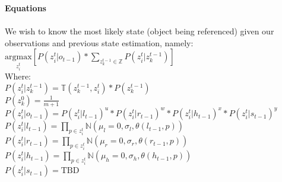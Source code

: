 \documentclass[12pt,letterpaper]{article}
\begin{document}
\textbf{Equations}\\\\
We wish to know the most likely state (object being referenced) given our observations and previous state estimation, namely:\\
$\underset{z^t_i}{\text{argmax}}[P(z^t_i | o_{t-1})*\displaystyle\sum_{z^{t-1}_k \in \mathbb{Z}} P(z^t_i|z^{t-1}_k)] $\\
Where:\\
$P(z^t_i | z^{t-1}_k) = \mathbb{T}(z^{t-1}_k, z^t_i)*P(z^{t-1}_k)$\\
$P(z^0_k) = \frac{1}{m+1}$\\
$P(z^t_i|o_{t-1}) = P(z^t_i|l_{t-1})^u*P(z^t_i|r_{t-1})^w*P(z^t_i|h_{t-1})^x*P(z^t_i|s_{t-1})^y$\\
$P(z^t_i|l_{t-1}) = \displaystyle \prod_{p \in z^t_i} \mathbb{N}(\mu_l=0, \sigma_l, \theta(l_{t-1}, p))$\\
$P(z^t_i|r_{t-1})=\displaystyle \prod_{p \in z^t_i} \mathbb{N}(\mu_r=0, \sigma_r, \theta(r_{t-1}, p))$\\
$P(z^t_i|h_{t-1}) =\displaystyle \prod_{p \in z^t_i} \mathbb{N}(\mu_h=0, \sigma_h, \theta(h_{t-1}, p))$\\
$P(z^t_i|s_{t-1}) = \text{TBD}$
\end{document}
